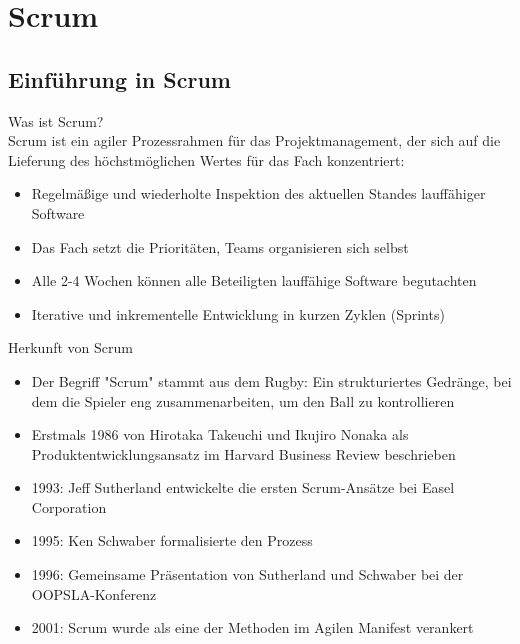 \section{Scrum}

\subsection{Einführung in Scrum}

\begin{definition}{Was ist Scrum?}\\
    Scrum ist ein agiler Prozessrahmen für das Projektmanagement, der sich auf die Lieferung des höchstmöglichen Wertes für das Fach konzentriert:
    \begin{itemize}
        \item Regelmäßige und wiederholte Inspektion des aktuellen Standes lauffähiger Software
        \item Das Fach setzt die Prioritäten, Teams organisieren sich selbst
        \item Alle 2-4 Wochen können alle Beteiligten lauffähige Software begutachten
        \item Iterative und inkrementelle Entwicklung in kurzen Zyklen (Sprints)
    \end{itemize}
\end{definition}

\begin{concept}{Herkunft von Scrum}\\
    \begin{itemize}
        \item Der Begriff "Scrum" stammt aus dem Rugby: Ein strukturiertes Gedränge, bei dem die Spieler eng zusammenarbeiten, um den Ball zu kontrollieren
        \item Erstmals 1986 von Hirotaka Takeuchi und Ikujiro Nonaka als Produktentwicklungsansatz im Harvard Business Review beschrieben
        \item 1993: Jeff Sutherland entwickelte die ersten Scrum-Ansätze bei Easel Corporation
        \item 1995: Ken Schwaber formalisierte den Prozess
        \item 1996: Gemeinsame Präsentation von Sutherland und Schwaber bei der OOPSLA-Konferenz
        \item 2001: Scrum wurde als eine der Methoden im Agilen Manifest verankert
    \end{itemize}
\end{concept}


